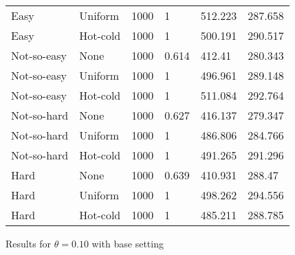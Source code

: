 \documentclass[11pt,a4paper,draft]{article}
\begin{document}
\begin{figure}[!htb]
\begin{tabular}{llllll}
		Easy & Uniform & 1000 & 1 & 512.223 & 287.658 \\
		Easy & Hot-cold & 1000 & 1 & 500.191 & 290.517 \\ \hline
		Not-so-easy & None & 1000 & 0.614 & 412.41 & 280.343 \\
		Not-so-easy & Uniform & 1000 & 1 & 496.961 & 289.148 \\
		Not-so-easy & Hot-cold & 1000 & 1 & 511.084 & 292.764 \\ \hline
		Not-so-hard & None & 1000 & 0.627 & 416.137 & 279.347 \\
		Not-so-hard & Uniform & 1000 & 1 & 486.806 & 284.766 \\
		Not-so-hard & Hot-cold & 1000 & 1 & 491.265 & 291.296 \\ \hline
		Hard & None & 1000 & 0.639 & 410.931 & 288.47 \\
		Hard & Uniform & 1000 & 1 & 498.262 & 294.556 \\
		Hard & Hot-cold & 1000 & 1 & 485.211 & 288.785 \\ \hline\hline
	\end{tabular}
	\caption{Results for $\theta = 0.10$ with base setting}
\end{figure}
\end{document}
